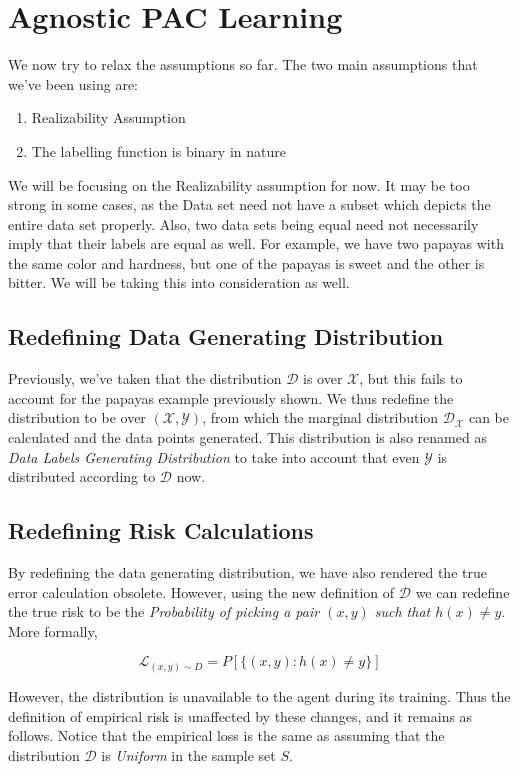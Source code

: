\documentclass[11pt,oneside,onemany]{book} %
\begin{document}
\section{Agnostic PAC Learning}
We now try to relax the assumptions so far. The two main assumptions that we've been using are:
\begin{enumerate}
    \item Realizability Assumption
    \item The labelling function is binary in nature
\end{enumerate}
\vspace{3mm}
We will be focusing on the Realizability assumption for now. It may be too strong in some cases, as the Data set need not have a subset which depicts the entire data set properly. Also, two data sets being equal need not necessarily imply that their labels are equal as well. For example, we have two papayas with the same color and hardness, but one of the papayas is sweet and the other is bitter. We will be taking this into consideration as well.

\subsection{Redefining Data Generating Distribution}
Previously, we've taken that the distribution $\mathcal{D}$ is over $\mathcal{X}$, but this fails to account for the papayas example previously shown. We thus redefine the distribution to be over $(\mathcal{X},\mathcal{Y})$, from which the marginal distribution $\mathcal{D}_\mathcal{X}$ can be calculated and the data points generated. This distribution is also renamed as \emph{Data Labels Generating Distribution} to take into account that even $\mathcal{Y}$ is distributed according to $\mathcal{D}$ now.\\

\subsection{Redefining Risk Calculations}
By redefining the data generating distribution, we have also rendered the true error calculation obsolete. However, using the new definition of $\mathcal{D}$ we can redefine the true risk to be the \emph{Probability of picking a pair $(x,y)$ such that $h(x)\neq y$}.
More formally,

$$\mathcal{L}_{(x,y)\sim D} = P[\{(x,y): h(x)\neq y\}]$$

However, the distribution is unavailable to the agent during its training. Thus the definition of empirical risk is unaffected by these changes, and it remains as follows. Notice that the empirical loss is the same as assuming that the distribution $\mathcal{D}$ is \emph{Uniform} in the sample set $S$.
\end{document}

